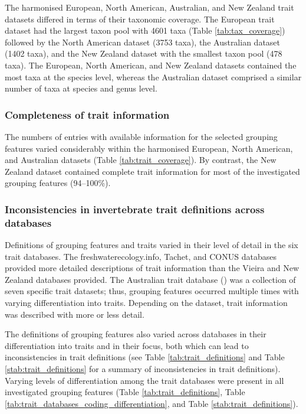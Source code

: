 \documentclass[12pt]{article}
\begin{document}
The harmonised European, North American, Australian, and New Zealand trait datasets differed in terms of their taxonomic coverage. The European trait dataset had the largest taxon pool with 4601 taxa (Table \ref{tab:tax_coverage}) followed by the North American dataset (3753 taxa), the Australian dataset (1402 taxa), and the New Zealand dataset with the smallest taxon pool (478 taxa). The European, North American, and New Zealand datasets contained the most taxa at the species level, whereas the Australian dataset comprised a similar number of taxa at species and genus level.


\subsubsection*{Completeness of trait information}

The numbers of entries with available information for the selected grouping features varied considerably within the harmonised European, North American, and Australian datasets (Table \ref{tab:trait_coverage}). By contrast, the New Zealand dataset contained complete trait information for most of the investigated grouping features (94–100\%).


\subsubsection*{Inconsistencies in invertebrate trait definitions across databases}

Definitions of grouping features and traits varied in their level of detail in the six trait databases. The freshwaterecology.info, Tachet, and CONUS databases provided more detailed descriptions of trait information than the Vieira and New Zealand databases provided. The Australian trait database (\cite{keffordIntegratedDatabaseStream2020a}) was a collection of seven specific trait datasets; thus, grouping features occurred multiple times with varying differentiation into traits. Depending on the dataset, trait information was described with more or less detail.

The definitions of grouping features also varied across databases in their differentiation into traits and in their focus, both which can lead to inconsistencies in trait definitions (see Table \ref{tab:trait_definitions} and Table \ref{stab:trait_definitions} for a summary of inconsistencies in trait definitions). Varying levels of differentiation among the trait databases were present in all investigated grouping features (Table \ref{tab:trait_definitions}, Table \ref{tab:trait_databases_coding_differentiation}, and Table \ref{stab:trait_definitions}).
\end{document}
